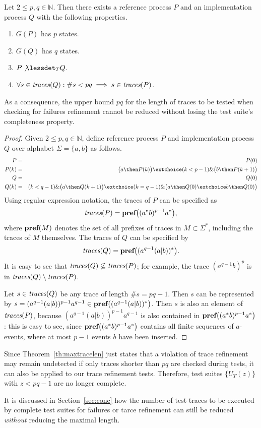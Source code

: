 \begin{theorem}\label{th:maxtracelen}
Let $2\le p,q \in\mathbb{N}$. Then there exists a reference process $P$ and an
implementation process $Q$ with the following properties.
\begin{enumerate}
\item $G(P)$ has $p$ states.
\item $G(Q)$ has $q$ states.
\item $P\not\lessdet_T Q$.
\item $\forall s\in\text{\it traces}(Q): \#s < pq\implies s\in\text{\it traces}(P)$.
\end{enumerate}
As a consequence, the upper bound $pq$ for the length of traces to be tested when checking for failures refinement cannot be reduced without losing the test suite's completeness property.
\end{theorem}
\begin{proof}
Given $2\le p,q \in\mathbb{N}$, define reference process $P$ and implementation process $Q$
over alphabet $\Sigma =\{ a,b\}$ as follows.
\begin{eqnarray*}
P & = &  P(0)
\\
P(k) & = & \big( a \then P(k) \big) \extchoice (k < p-1) \& \big( b \then P(k+1)\big)
\\
Q & = & Q(0)
\\
Q(k) & = & (k < q-1) \& \big( a \then Q(k+1)    \big) \extchoice
( k = q-1)\& \big( a\then Q(0) \extchoice b\then Q(0)  \big)
\end{eqnarray*}
Using regular expression notation, the traces of $P$ can be specified as
\[
\text{\it traces}(P) = \text{\bf pref}\big(  (a^*b)^{p-1}a^* \big),
\]
where $\text{\bf pref}(M)$ denotes the set of all prefixes of traces in $M\subset\Sigma^*$,
including the traces of $M$ themselves.
The traces of $Q$ can be specified by
\[
\text{\it traces}(Q) = \text{\bf pref}\big( (a^{q-1}(a|b))^*  \big).
\]
It is easy to see that $\text{\it traces}(Q)\not\subseteq\text{\it traces}(P)$;
for example, the trace $(a^{q-1}b)^p$ is in
$\text{\it traces}(Q)\setminus\text{\it traces}(P)$.

Let $s \in\text{\it traces}(Q)$ be any trace of length $\#s = pq-1$. Then $s$ can be represented
by $s = (a^{q-1}(a|b))^{p-1}a^{q-1} \in \text{\bf pref}\big( (a^{q-1}(a|b))^*  \big)$.
Then $s$ is also an element of $\text{\it traces}(P)$, because $(a^{q-1}(a|b))^{p-1}a^{q-1}$
is also contained in $\text{\bf pref}\big(  (a^*b)^{p-1}a^* \big)$: this is easy to see, since
$\text{\bf pref}\big(  (a^*b)^{p-1}a^* \big)$ contains all finite sequences of $a$-events,
where at most $p-1$ events $b$ have been inserted.
\xbox
\end{proof}

Since Theorem~\ref{th:maxtracelen} just states that a violation of trace refinement
may remain undetected if only traces shorter than $pq$ are checked during tests,
it can also be applied to our trace refinement tests. Therefore,
test suites $\{ U_T(z) \}$ with $z<pq-1$ are no longer complete.


It is discussed in Section~\ref{sec:conc} how the number of test traces to be executed
by complete test suites for failures or tarce
refinement   can still be reduced {\it without} reducing
the maximal length.

